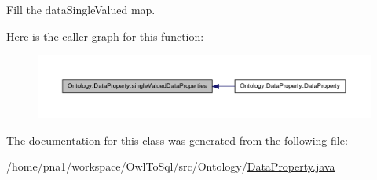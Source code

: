 Fill the dataSingleValued map. 

Here is the caller graph for this function:\nopagebreak
\begin{figure}[H]
\begin{center}
\leavevmode
\includegraphics[width=400pt]{class_ontology_1_1_data_property_a5b082464ba431055164a63d976006916_icgraph}
\end{center}
\end{figure}




The documentation for this class was generated from the following file:\begin{DoxyCompactItemize}
\item 
/home/pna1/workspace/OwlToSql/src/Ontology/\hyperlink{_data_property_8java}{DataProperty.java}\end{DoxyCompactItemize}
